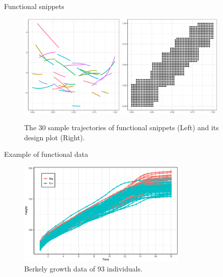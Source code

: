\documentclass[9pt]{beamer}
\begin{document}
\begin{frame}[allowframebreaks]{Functional snippets}
	\begin{figure}[h]
		\centering
		\includegraphics[height=5cm,keepaspectratio=true]{img/fun_snippets.eps}
		\includegraphics[height=5cm,keepaspectratio=true]{img/fun_snippets_design.eps}
		\caption{The 30 sample trajectories of functional snippets (Left) and its design plot (Right).}
		\label{fig3}
	\end{figure}
\end{frame}

\begin{frame}[allowframebreaks]{Example of functional data}
	\begin{figure}[h]
		\centering
		\includegraphics[height=5cm,keepaspectratio=true]{img/growth.eps}
		\caption{Berkely growth data of 93 individuals.}
	\end{figure}
\end{frame}
\end{document}
